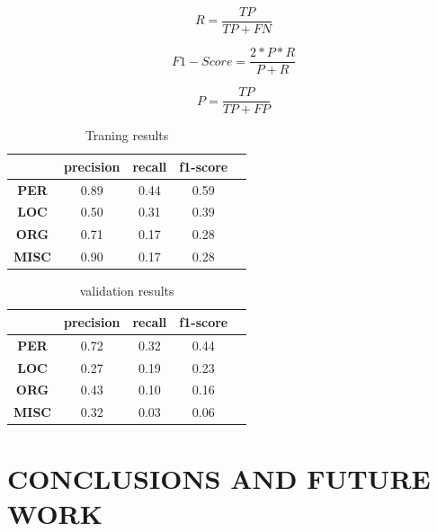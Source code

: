 \documentclass{IEEEtran}
\begin{document}
\begin{equation}
  \label{recall}
  R = \frac{TP}{TP + FN}
\end{equation}

\begin{equation}
  \label{f1}
  F1-Score = \frac{2*P*R}{P + R}
\end{equation}

\begin{equation}
  \label{precision}
  P = \frac{TP}{TP + FP}
\end{equation}

\begin{table}[ht]
  \caption{Traning results}
  \centering
  \begin{tabular}{|c|c|c|c|c|}
    \hline
    \textbf{}     & \textbf{precision} & \textbf{recall} & \textbf{f1-score} \\ \hline
    \textbf{PER}  & 0.89               & 0.44            & 0.59              \\ \hline
    \textbf{LOC}  & 0.50               & 0.31            & 0.39              \\ \hline
    \textbf{ORG}  & 0.71               & 0.17            & 0.28              \\ \hline
    \textbf{MISC} & 0.90               & 0.17            & 0.28              \\ \hline
  \end{tabular}
  \label{tab:results}
\end{table}


\begin{table}[ht]
  \caption{validation results}
  \centering
  \begin{tabular}{|c|c|c|c|c|}
    \hline
    \textbf{}     & \textbf{precision} & \textbf{recall} & \textbf{f1-score} \\ \hline
    \textbf{PER}  & 0.72               & 0.32            & 0.44              \\ \hline
    \textbf{LOC}  & 0.27               & 0.19            & 0.23              \\ \hline
    \textbf{ORG}  & 0.43               & 0.10            & 0.16              \\ \hline
    \textbf{MISC} & 0.32               & 0.03            & 0.06              \\ \hline
  \end{tabular}
  \label{tab:results_validation}
\end{table}


\section{CONCLUSIONS AND FUTURE WORK}
\end{document}
